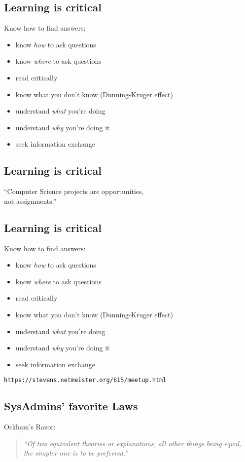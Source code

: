 \documentclass[xga]{xdvislides}
\newcommand{\smallish}{\fontsize{18}{18}\selectfont}
\begin{document}
\subsection{Learning is critical}
Know how to find answers:
\begin{itemize}
	\item know {\em how} to ask questions
	\item know {\em where} to ask questions
	\item read critically
	\item know what you don't know (Dunning-Kruger effect)
	\item understand {\em what} you're doing
	\item understand {\em why} you're doing it
	\item seek information exchange
\end{itemize}

\subsection{Learning is critical}
\vspace{1in}
\Huge
\begin{center}
``Computer Science projects are opportunities, \\
not assignments.'' \\
\end{center}
\Normalsize

\subsection{Learning is critical}
Know how to find answers:
\begin{itemize}
	\item know {\em how} to ask questions
	\item know {\em where} to ask questions
	\item read critically
	\item know what you don't know (Dunning-Kruger effect)
	\item understand {\em what} you're doing
	\item understand {\em why} you're doing it
	\item seek information exchange
\end{itemize}
\vspace{.5in}
\verb+https://stevens.netmeister.org/615/meetup.html+

\subsection{SysAdmins' favorite Laws}
\smallish
Ockham's Razor:
\begin{quote}
{\em ``Of two equivalent theories or explanations, all other things being
equal, the simpler one is to be preferred.''}
\end{quote}
\Normalsize
\end{document}
